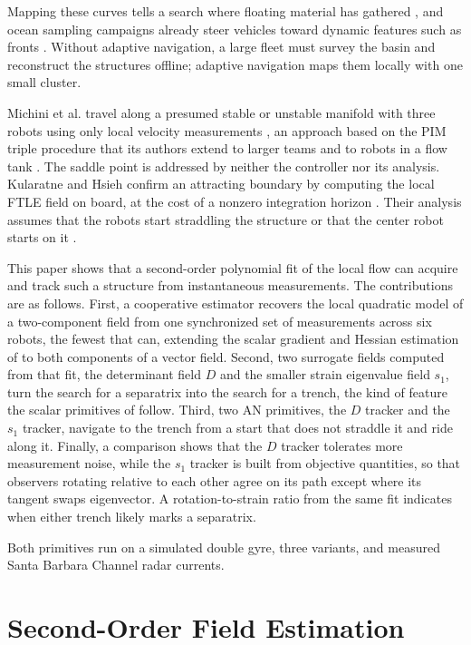 \documentclass[lettersize,journal]{IEEEtran}
\begin{document}
Mapping these curves tells a search where floating material has gathered
\cite{12}, and ocean sampling campaigns already steer vehicles toward
dynamic features such as fronts \cite{23,24,25}. Without adaptive
navigation, a large fleet must survey the basin and reconstruct the
structures offline; adaptive navigation maps them locally with one small
cluster.


Michini et al. travel along a presumed stable or
unstable manifold with three robots using only local velocity
measurements \cite{26}, an approach based on the PIM triple procedure
that its authors extend to larger teams \cite{27} and to robots in a flow
tank \cite{28}. The saddle point is addressed by neither the
controller nor its analysis.
Kularatne and Hsieh confirm an attracting boundary by computing the local
FTLE field on board, at the cost of a nonzero integration horizon
\cite{29}.
Their analysis assumes that the robots start straddling the structure
\cite{26,27} or that the center robot starts on it \cite{29}.


This paper shows that a second-order polynomial fit of the local flow can
acquire and track such a structure from instantaneous measurements. The
contributions are as follows.
First, a cooperative estimator recovers the local quadratic model of
a two-component field from one synchronized set of measurements across six
robots, the fewest that can, extending the scalar gradient and Hessian
estimation of \cite{5} to both components of a vector field. Second, two surrogate fields computed from that fit,
the determinant field $D$ and the smaller strain eigenvalue field $s_1$,
turn the search for a separatrix into the search for a trench, the kind of
feature the scalar primitives of \cite{3} follow. Third, two AN
primitives, the $D$ tracker and the $s_1$ tracker, navigate to the trench
from a start that does not straddle it and ride along it. Finally, a
comparison shows that the $D$ tracker tolerates more measurement noise,
while the $s_1$ tracker is built from objective quantities, so that
observers rotating relative to each other agree on its path except where
its tangent swaps eigenvector. A rotation-to-strain ratio from the same
fit indicates when either trench likely marks a separatrix.

Both primitives run on a simulated double gyre, three variants, and
measured Santa Barbara Channel radar currents.

\section{Second-Order Field Estimation}
\end{document}
